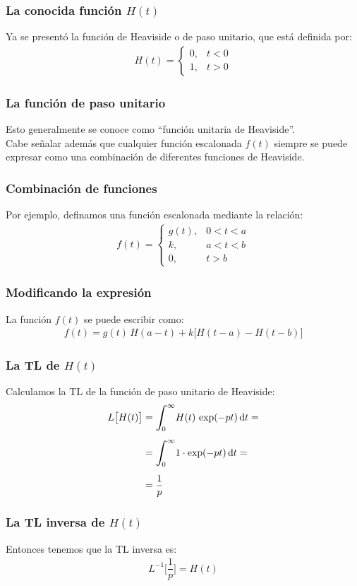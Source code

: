 \documentclass[12pt]{beamer}
\begin{document}
\begin{frame}
\frametitle{La conocida función $H (t)$}
Ya se presentó la función de Heaviside o de paso unitario, que está definida por:
\pause
\begin{align*}
H(t) = \begin{cases}
0, & t < 0 \\
1, & t > 0
\end{cases}
\end{align*}
\end{frame}
\begin{frame}
\frametitle{La función de paso unitario}
Esto generalmente se conoce como \enquote{función unitaria de Heaviside}.
\\
\bigskip
\pause
Cabe señalar además que cualquier función escalonada $f(t)$ siempre se puede expresar como una combinación de diferentes funciones de Heaviside.
\end{frame}
\begin{frame}
\frametitle{Combinación de funciones}
Por ejemplo, definamos una función escalonada mediante la relación:
\pause
\begin{align*}
f (t) = \begin{cases}
g (t), & 0 < t < a \\
k, & a < t < b \\
0, & t > b
\end{cases}
\end{align*}    
\end{frame}
\begin{frame}
\frametitle{Modificando la expresión}
La función $f (t)$ se puede escribir como:
\pause
\begin{align*}
f(t) = g(t) \, H (a - t) + k \big[ H (t - a) - H (t - b) \big]
\end{align*}
\end{frame}
\begin{frame}
\frametitle{La TL de $H (t)$}
Calculamos la TL de la función de paso unitario de Heaviside:
\pause
\begin{eqnarray*}
\begin{aligned}
L \big[ H (t) \big] &= \scaleint{6ex}_{\bs 0}^{\infty} H (t) \, \exp(- p t) \dd{t} = \\[0.5em]
&= \scaleint{6ex}_{\bs 0}^{\infty} 1 \cdot \exp(- p t) \dd{t} = \\[0.5em]
&= \dfrac{1}{p}
\end{aligned}
\end{eqnarray*}
\end{frame}
\begin{frame}
\frametitle{La TL inversa de $H (t)$}
Entonces tenemos que la TL inversa es:
\pause
\begin{align*}
L^{-1} \bigg[ \dfrac{1}{p} \bigg] = H (t)
\end{align*}
\end{frame}
\end{document}
